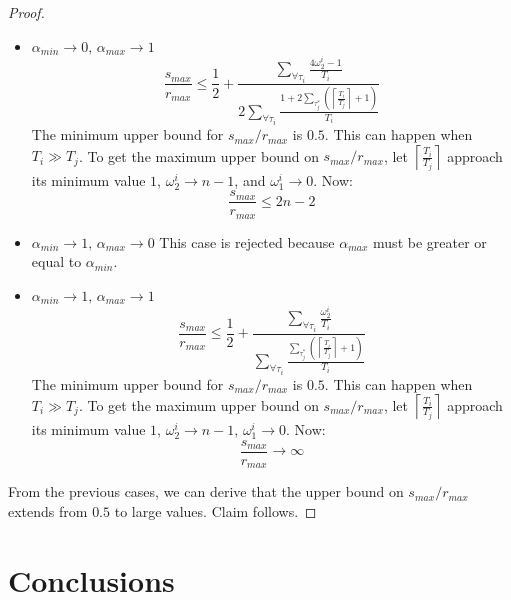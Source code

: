 \documentclass[12pt,english]{report}
\newtheorem{proof}{Proof}
\begin{document}
\begin{proof}
\begin{itemize}
\item $\alpha_{min}\rightarrow0,\,\alpha_{max}\rightarrow1$
\begin{equation}
\frac{s_{max}}{r_{max}}\le\frac{1}{2}+\frac{\sum_{\forall\tau_{i}}\frac{4\omega_{2}^{i}-1}{T_{i}}}{2\sum_{\forall\tau_{i}}\frac{1+2\sum_{\tau_{j}^{*}}\left(\left\lceil \frac{T_{i}}{T_{j}}\right\rceil +1\right)}{T_{i}}}\label{eq:lcm rma lock-free comparison 4}
\end{equation}
The minimum upper bound for $s_{max}/r_{max}$ is $0.5$. This can
happen when $T_{i}\gg T_{j}$. To get the maximum upper bound on $s_{max}/r_{max}$,
let $\left\lceil \frac{T_{i}}{T_{j}}\right\rceil $ approach its
minimum value $1$, $\omega_{2}^{i}\rightarrow n-1$, and $\omega_{1}^{i}\rightarrow0$. 
Now:
\[
\frac{s_{max}}{r_{max}}\le2n-2
\]

\item $\alpha_{min}\rightarrow1,\,\alpha_{max}\rightarrow0$
This case is rejected because $\alpha_{max}$ must be greater or equal
to $\alpha_{min}$.

\item $\alpha_{min}\rightarrow1,\,\alpha_{max}\rightarrow1$
\begin{equation}
\frac{s_{max}}{r_{max}}\le\frac{1}{2}+\frac{\sum_{\forall\tau_{i}}\frac{\omega_{2}^{i}}{T_{i}}}{\sum_{\forall\tau_{i}}\frac{\sum_{\tau_{j}^{*}}\left(\left\lceil \frac{T_{i}}{T_{j}}\right\rceil +1\right)}{T_{i}}}\label{eq:lcm rma lock-free comparison 5}
\end{equation}
The minimum upper bound for $s_{max}/r_{max}$ is $0.5$. This can
happen when $T_{i}\gg T_{j}$. To get the maximum upper bound on $s_{max}/r_{max}$,
let $\left\lceil \frac{T_{i}}{T_{j}}\right\rceil $ approach its
minimum value $1$, $\omega_{2}^{i}\rightarrow n-1,\,\omega_{1}^{i}\rightarrow0$.
Now:  
\[
\frac{s_{max}}{r_{max}}\rightarrow\infty
\]

\end{itemize}
From the previous cases, we can derive that the upper bound on $s_{max}/r_{max}$
extends from $0.5$ to large values. Claim follows.
\end{proof}

\section{Conclusions}
\label{sec:conclusions_lcm}
\end{document}
